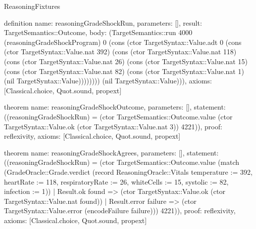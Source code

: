 \begin{lexlean}{ReasoningFixtures}
\begin{semanticmodule}
definition{
  name: reasoningGradeShockRun,
  parameters: [],
  result: TargetSemantics::Outcome,
  body: (TargetSemantics::run 4000 (reasoningGradeShockProgram) 0 (cons (ctor TargetSyntax::Value.adt 0 (cons (ctor TargetSyntax::Value.nat 392) (cons (ctor TargetSyntax::Value.nat 118) (cons (ctor TargetSyntax::Value.nat 26) (cons (ctor TargetSyntax::Value.nat 15) (cons (ctor TargetSyntax::Value.nat 82) (cons (ctor TargetSyntax::Value.nat 1) (nil TargetSyntax::Value)))))))) (nil TargetSyntax::Value))),
  axioms: [Classical.choice, Quot.sound, propext]
}

theorem{
  name: reasoningGradeShockOutcome,
  parameters: [],
  statement: ((reasoningGradeShockRun) = (ctor TargetSemantics::Outcome.value (ctor TargetSyntax::Value.ok (ctor TargetSyntax::Value.nat 3)) 4221)),
  proof: reflexivity{},
  axioms: [Classical.choice, Quot.sound, propext]
}

theorem{
  name: reasoningGradeShockAgrees,
  parameters: [],
  statement: ((reasoningGradeShockRun) = (ctor TargetSemantics::Outcome.value (match (GradeOracle::Grade.verdict (record ReasoningOracle::Vitals {temperature := 392, heartRate := 118, respiratoryRate := 26, whiteCells := 15, systolic := 82, infection := 1}))
    | Result.ok found => (ctor TargetSyntax::Value.ok (ctor TargetSyntax::Value.nat found))
    | Result.error failure => (ctor TargetSyntax::Value.error (encodeFailure failure))) 4221)),
  proof: reflexivity{},
  axioms: [Classical.choice, Quot.sound, propext]
}


\end{semanticmodule}
\end{lexlean}
